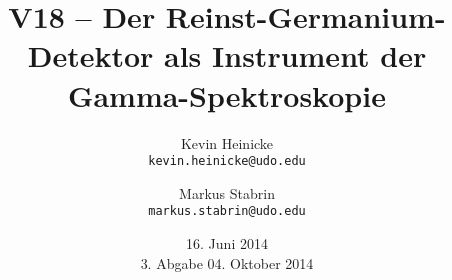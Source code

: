 

\title{%
    V18 -- Der Reinst-Germanium-Detektor als Instrument der Gamma-Spektroskopie
}
\author{%
    Kevin Heinicke\\
    \texttt{kevin.heinicke@udo.edu}
    \and
    Markus Stabrin\\
    \texttt{markus.stabrin@udo.edu}
}

\date{
    16. Juni 2014\\
    {\small 3. Abgabe} 04. Oktober 2014
}

    \maketitle%
    \tableofcontents
    \newpage

    
    

    \printbibliography

